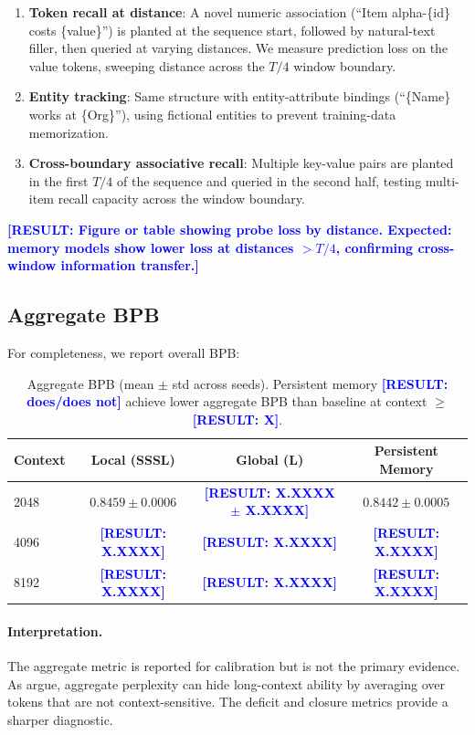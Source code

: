 \documentclass[11pt]{article}
\newcommand{\result}[1]{\textcolor{blue}{\textbf{[RESULT: #1]}}}
\begin{document}
\begin{enumerate}
\item \textbf{Token recall at distance}: A novel numeric association
  (``Item alpha-\{id\} costs \{value\}'') is planted at the sequence
  start, followed by natural-text filler, then queried at varying
  distances. We measure prediction loss on the value tokens, sweeping
  distance across the $T/4$ window boundary.

\item \textbf{Entity tracking}: Same structure with entity-attribute
  bindings (``\{Name\} works at \{Org\}''), using fictional entities
  to prevent training-data memorization.

\item \textbf{Cross-boundary associative recall}: Multiple key-value
  pairs are planted in the first $T/4$ of the sequence and queried
  in the second half, testing multi-item recall capacity across the
  window boundary.
\end{enumerate}

\result{Figure or table showing probe loss by distance.
Expected: memory models show lower loss at distances $> T/4$,
confirming cross-window information transfer.}

\subsection{Aggregate BPB}

For completeness, we report overall BPB:

\begin{table}[h]
\centering
\caption{Aggregate BPB (mean $\pm$ std across seeds).
  Persistent memory \result{does/does not} achieve lower aggregate
  BPB than baseline at context $\geq$ \result{X}.}
\label{tab:aggregate}
\begin{tabular}{lccc}
\toprule
Context & Local (SSSL) & Global (L) & Persistent Memory \\
\midrule
2048 & $0.8459 \pm 0.0006$ & \result{X.XXXX $\pm$ X.XXXX} & $0.8442 \pm 0.0005$ \\
4096 & \result{X.XXXX} & \result{X.XXXX} & \result{X.XXXX} \\
8192 & \result{X.XXXX} & \result{X.XXXX} & \result{X.XXXX} \\
\bottomrule
\end{tabular}
\end{table}

\paragraph{Interpretation.}
The aggregate metric is reported for calibration but is not the
primary evidence. As \citet{fang2025longppl} argue, aggregate
perplexity can hide long-context ability by averaging over tokens
that are not context-sensitive. The deficit and closure metrics
provide a sharper diagnostic.
\end{document}
